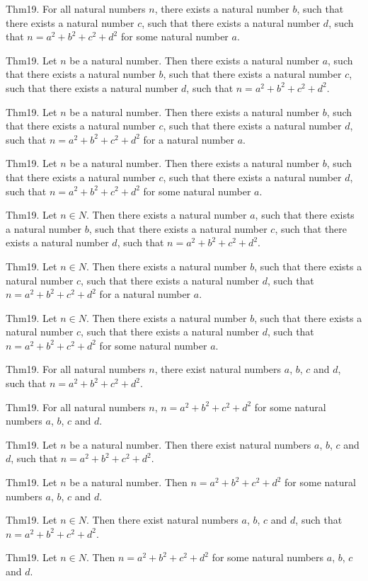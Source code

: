 \documentclass{article}
\begin{document}
Thm19. For all natural numbers $n$, there exists a natural number $b$, such that there exists a natural number $c$, such that there exists a natural number $d$, such that $n = a ^{ 2}+ b ^{ 2}+ c ^{ 2}+ d ^{ 2}$ for some natural number $a$.

Thm19. Let $n$ be a natural number. Then there exists a natural number $a$, such that there exists a natural number $b$, such that there exists a natural number $c$, such that there exists a natural number $d$, such that $n = a ^{ 2}+ b ^{ 2}+ c ^{ 2}+ d ^{ 2}$.

Thm19. Let $n$ be a natural number. Then there exists a natural number $b$, such that there exists a natural number $c$, such that there exists a natural number $d$, such that $n = a ^{ 2}+ b ^{ 2}+ c ^{ 2}+ d ^{ 2}$ for a natural number $a$.

Thm19. Let $n$ be a natural number. Then there exists a natural number $b$, such that there exists a natural number $c$, such that there exists a natural number $d$, such that $n = a ^{ 2}+ b ^{ 2}+ c ^{ 2}+ d ^{ 2}$ for some natural number $a$.

Thm19. Let $n \in N$. Then there exists a natural number $a$, such that there exists a natural number $b$, such that there exists a natural number $c$, such that there exists a natural number $d$, such that $n = a ^{ 2}+ b ^{ 2}+ c ^{ 2}+ d ^{ 2}$.

Thm19. Let $n \in N$. Then there exists a natural number $b$, such that there exists a natural number $c$, such that there exists a natural number $d$, such that $n = a ^{ 2}+ b ^{ 2}+ c ^{ 2}+ d ^{ 2}$ for a natural number $a$.

Thm19. Let $n \in N$. Then there exists a natural number $b$, such that there exists a natural number $c$, such that there exists a natural number $d$, such that $n = a ^{ 2}+ b ^{ 2}+ c ^{ 2}+ d ^{ 2}$ for some natural number $a$.

Thm19. For all natural numbers $n$, there exist natural numbers $a$, $b$, $c$ and $d$, such that $n = a ^{ 2}+ b ^{ 2}+ c ^{ 2}+ d ^{ 2}$.

Thm19. For all natural numbers $n$, $n = a ^{ 2}+ b ^{ 2}+ c ^{ 2}+ d ^{ 2}$ for some natural numbers $a$, $b$, $c$ and $d$.

Thm19. Let $n$ be a natural number. Then there exist natural numbers $a$, $b$, $c$ and $d$, such that $n = a ^{ 2}+ b ^{ 2}+ c ^{ 2}+ d ^{ 2}$.

Thm19. Let $n$ be a natural number. Then $n = a ^{ 2}+ b ^{ 2}+ c ^{ 2}+ d ^{ 2}$ for some natural numbers $a$, $b$, $c$ and $d$.

Thm19. Let $n \in N$. Then there exist natural numbers $a$, $b$, $c$ and $d$, such that $n = a ^{ 2}+ b ^{ 2}+ c ^{ 2}+ d ^{ 2}$.

Thm19. Let $n \in N$. Then $n = a ^{ 2}+ b ^{ 2}+ c ^{ 2}+ d ^{ 2}$ for some natural numbers $a$, $b$, $c$ and $d$.
\end{document}
